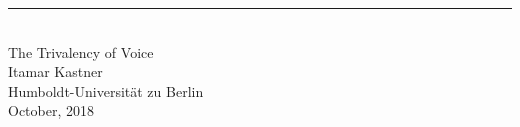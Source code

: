 \singlespacing
\begin{center}
\rule{165pt}{0pt} \\
\vspace{1cm}
\LARGE{The Trivalency of Voice}\\
\vspace{2cm}
\large{Itamar Kastner} \\
\vspace{0.4cm}
\normalsize{Humboldt-Universit\"at zu Berlin} \\
\vspace{1cm}
\normalsize{October, 2018} %

\end{center}